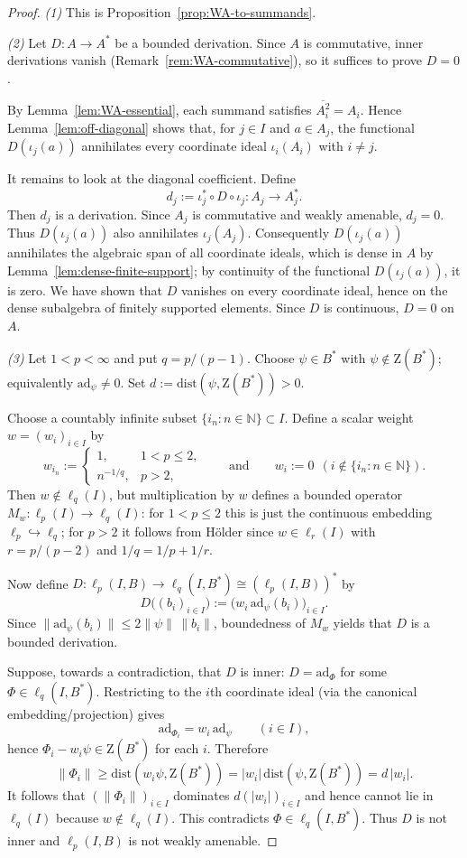 \documentclass[reqno]{amsart}
\theoremstyle{plain}
\theoremstyle{definition}
\theoremstyle{remark}
\renewcommand{\le}{\leqslant}
\renewcommand{\ge}{\geqslant}
\newcommand{\ad}{\mathrm{ad}}
\newcommand{\Zc}{\mathrm{Z}} %
\begin{document}
\begin{proof}
\emph{(1)} This is Proposition~\ref{prop:WA-to-summands}.

\smallskip

\emph{(2)} Let $D\colon A\to A^*$ be a bounded derivation.
Since $A$ is commutative, inner derivations vanish (Remark~\ref{rem:WA-commutative}), so it suffices to prove $D=0$.

By Lemma~\ref{lem:WA-essential}, each summand satisfies $\overline{A_i^2}=A_i$.
Hence Lemma~\ref{lem:off-diagonal} shows that, for $j\in I$ and $a\in A_j$, the
functional $D(\iota_j(a))$ annihilates every coordinate ideal $\iota_i(A_i)$ with
$i\neq j$.

It remains to look at the diagonal coefficient.  Define
\[
d_j:=\iota_j^*\circ D\circ \iota_j\colon A_j\to A_j^*.
\]
Then $d_j$ is a derivation.  Since $A_j$ is commutative and weakly amenable, $d_j=0$.
Thus $D(\iota_j(a))$ also annihilates $\iota_j(A_j)$.  Consequently
$D(\iota_j(a))$ annihilates the algebraic span of all coordinate ideals, which is dense in
$A$ by Lemma~\ref{lem:dense-finite-support}; by continuity of the functional
$D(\iota_j(a))$, it is zero.  We have shown that $D$ vanishes on every coordinate ideal,
hence on the dense subalgebra of finitely supported elements.  Since $D$ is continuous,
$D=0$ on $A$.

\smallskip
\emph{(3)} Let $1<p<\infty$ and put $q=p/(p-1)$.
Choose $\psi\in B^*$ with $\psi\notin \Zc(B^*)$; equivalently $\ad_\psi\neq 0$.
Set $d:=\mathrm{dist}(\psi,\Zc(B^*))>0$.

Choose a countably infinite subset $\{i_n:n\in\mathbb N\}\subset I$.
Define a scalar weight $w=(w_i)_{i\in I}$ by
\[
w_{i_n}:=
\begin{cases}
1, & 1<p\le 2,\\[2pt]
n^{-1/q}, & p>2,
\end{cases}
\qquad\text{and}\qquad
w_i:=0\ \ (i\notin \{i_n:n\in\mathbb N\}).
\]
Then $w\notin \ell_q(I)$, but multiplication by $w$ defines a bounded operator
$M_w\colon \ell_p(I)\to \ell_q(I)$:
for $1<p\le 2$ this is just the continuous embedding $\ell_p\hookrightarrow \ell_q$;
for $p>2$ it follows from H\"older since $w\in \ell_r(I)$ with $r=p/(p-2)$ and $1/q=1/p+1/r$.

Now define $D\colon \ell_p(I,B)\to \ell_q(I,B^*)\cong (\ell_p(I,B))^*$ by
\[
D\bigl((b_i)_{i\in I}\bigr):=\bigl(w_i\,\ad_\psi(b_i)\bigr)_{i\in I}.
\]
Since $\|\ad_\psi(b_i)\|\le 2\|\psi\|\,\|b_i\|$, boundedness of $M_w$ yields that $D$ is a bounded derivation.

Suppose, towards a contradiction, that $D$ is inner: $D=\ad_\Phi$ for some $\Phi\in \ell_q(I,B^*)$.
Restricting to the $i$th coordinate ideal (via the canonical embedding/projection) gives
\[
\ad_{\Phi_i}=w_i\,\ad_\psi\qquad (i\in I),
\]
hence $\Phi_i-w_i\psi\in \Zc(B^*)$ for each $i$.
Therefore
\[
\|\Phi_i\|\ge \mathrm{dist}(w_i\psi,\Zc(B^*))=|w_i|\,\mathrm{dist}(\psi,\Zc(B^*))=d\,|w_i|.
\]
It follows that $(\|\Phi_i\|)_{i\in I}$ dominates $d(|w_i|)_{i\in I}$ and hence cannot lie in $\ell_q(I)$ because $w\notin\ell_q(I)$.
This contradicts $\Phi\in\ell_q(I,B^*)$. Thus $D$ is not inner and $\ell_p(I,B)$ is not weakly amenable.
\end{proof}
\end{document}
